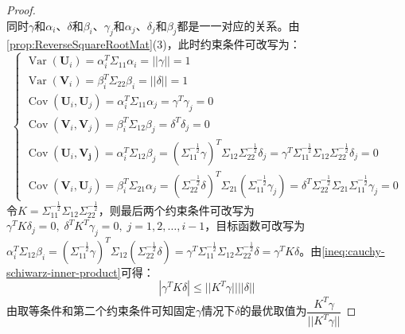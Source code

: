 \begin{proof}
\begin{equation*}
	\end{equation*}
	同时$\gamma$和$\alpha_i$、$\delta$和$\beta_i$、$\gamma_j$和$\alpha_j$、$\delta_j$和$\beta_j$都是一一对应的关系。由\cref{prop:ReverseSquareRootMat}(3)，此时约束条件可改写为：
	\begin{equation*}
		\begin{cases}
			\operatorname{Var}(\mathbf{U}_i)=\alpha_i^T\Sigma_{11}\alpha_i=||\gamma||=1 \\
			\operatorname{Var}(\mathbf{V}_i)=\beta_i^T\Sigma_{22}\beta_i=||\delta||=1 \\
			\operatorname{Cov}(\mathbf{U}_i,\mathbf{U}_j)=\alpha_i^T\Sigma_{11}\alpha_j=\gamma^T\gamma_j=0 \\
			\operatorname{Cov}(\mathbf{V}_i,\mathbf{V}_j)=\beta_i^T\Sigma_{12}\beta_j=\delta^T\delta_j=0 \\
			\operatorname{Cov}(\mathbf{U}_i,\mathbf{V_j})=\alpha_i^T\Sigma_{12}\beta_j=(\Sigma_{11}^{-\frac{1}{2}}\gamma)^T\Sigma_{12}\Sigma_{22}^{-\frac{1}{2}}\delta_j=\gamma^T\Sigma_{11}^{-\frac{1}{2}}\Sigma_{12}\Sigma_{22}^{-\frac{1}{2}}\delta_j=0 \\
			\operatorname{Cov}(\mathbf{V}_i,\mathbf{U}_j)=\beta_i^T\Sigma_{21}\alpha_j=(\Sigma_{22}^{-\frac{1}{2}}\delta)^T\Sigma_{21}(\Sigma_{11}^{-\frac{1}{2}}\gamma_j)=\delta^T\Sigma_{22}^{-\frac{1}{2}}\Sigma_{21}\Sigma_{11}^{-\frac{1}{2}}\gamma_j=0
		\end{cases}
	\end{equation*}
	令$K=\Sigma_{11}^{-\frac{1}{2}}\Sigma_{12}\Sigma_{22}^{-\frac{1}{2}}$，则最后两个约束条件可改写为$\gamma^TK\delta_j=0,\;\delta^TK^T\gamma_j=0,\;j=1,2,\dots,i-1$，目标函数可改写为$\alpha_i^T\Sigma_{12}\beta_i=(\Sigma_{11}^{-\frac{1}{2}}\gamma)^T\Sigma_{12}(\Sigma_{22}^{-\frac{1}{2}}\delta)=\gamma^T\Sigma_{11}^{-\frac{1}{2}}\Sigma_{12}\Sigma_{22}^{-\frac{1}{2}}\delta=\gamma^TK\delta$。由\cref{ineq:cauchy-schiwarz-inner-product}可得：
	\begin{equation*}
		|\gamma^TK\delta|\leqslant||K^T\gamma||||\delta||
	\end{equation*}
	由取等条件和第二个约束条件可知固定$\gamma$情况下$\delta$的最优取值为$\dfrac{K^T\gamma}{||K^T\gamma||}$
\end{proof}